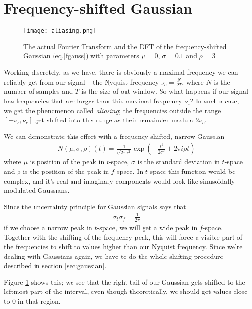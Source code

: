 \documentclass[10pt,a4paper,twocolumn]{article}
\begin{document}
\section{Frequency-shifted Gaussian}

\begin{figure}
\centering
\captionsetup{justification=centering}
\texttt{[image: aliasing.png]}
\caption{The actual Fourier Transform and the DFT of the frequency-shifted Gaussian (eq.\ref{fgauss}) with parameters $\mu = 0$, $\sigma = 0.1$ and $\rho = 3$.}
\label{fig:aliasing}
\end{figure}

Working discretely, as we have, there is obviously a maximal frequency we can reliably get from our signal -- the Nyquist frequency $\nu_c = \frac{N}{2 T}$, where $N$ is the number of samples and $T$ is the size of out window. So what happens if our signal has frequencies that are larger than this maximal frequency $\nu_c$? In such a case, we get the phenomenon called \emph{aliasing}; the frequencies outside the range $[-\nu_c, \nu_c]$ get shifted into this range as their remainder modulo $2 \nu_c$. \cite{aliasing}

We can demonstrate this effect with a frequency-shifted, narrow Gaussian
%
\begin{align}\label{fgauss}
N (\mu, \sigma, \rho)(t) = \frac{1}{\sqrt{2 \pi \sigma^2}} \exp \left( -\frac{t^2}{2 \sigma^2} + 2 \pi i \rho t \right)
\end{align}
%
where $\mu$ is position of the peak in $t$-space, $\sigma$ is the standard deviation in $t$-space and $\rho$ is the position of the peak in $f$-space. In $t$-space this function would be complex, and it's real and imaginary components would look like sinusoidally modulated Gaussians.

Since the uncertainty principle for Gaussian signals says that
%
\begin{align}
\sigma_t \sigma_f = \frac{1}{2 \pi}
\end{align}
%
if we choose a narrow peak in $t$-space, we will get a wide peak in $f$-space. Together with the shifting of the frequency peak, this will force a visible part of the frequencies to shift to values higher than our Nyquist frequency. Since we're dealing with Gaussians again, we have to do the whole shifting procedure described in section \ref{sec:gaussian}.

Figure \ref{fig:aliasing} shows this; we see that the right tail of our Gaussian gets shifted to the leftmost part of the interval, even though theoretically, we should get values close to $0$ in that region.
\end{document}
